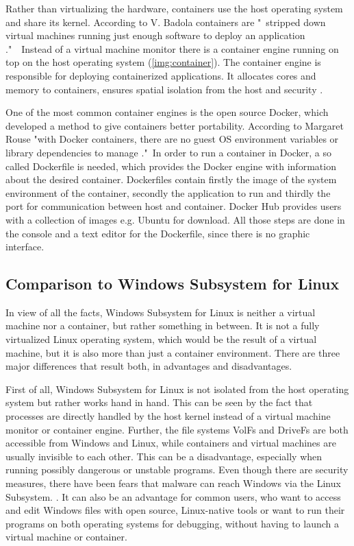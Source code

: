 \documentclass[utf8,biblatex, ngerman, english]{lni}
\begin{document}
Rather than virtualizing the hardware, containers use the host operating system and share its kernel. According to V. Badola containers are "\ stripped down virtual machines running just enough software to deploy an application \cite{Ba15}."\ \ Instead of a virtual machine monitor there is a container engine running on top on the host operating system (\ref{img:container}). 
The container engine is responsible for deploying containerized applications. It allocates cores and memory to containers, ensures spatial isolation from the host and security \cite{Do17}.

One of the most common container engines is the open source Docker, which developed a method to give containers better portability. According to Margaret Rouse "with Docker containers, there are no guest OS environment variables or library dependencies to manage \cite{Ma}."\ In order to run a container in Docker, a so called Dockerfile is needed, which provides the Docker engine with information about the desired container.
Dockerfiles contain firstly the image of the system environment of the container, secondly the application to run and thirdly the port for communication between host and container. Docker Hub provides users with a collection of images e.g. Ubuntu for download. All those steps are done in the console and a text editor for the Dockerfile, since there is no graphic interface.

\subsection{Comparison to Windows Subsystem for Linux}

In view of all the facts, Windows Subsystem for Linux is neither a virtual machine nor a container, but rather something in between. It is not a fully virtualized Linux operating system, which would be the result of a virtual machine, but it is also more than just a container environment. There are three major differences that result both, in advantages and disadvantages.


First of all, Windows Subsystem for Linux is not isolated from the host operating system but rather works hand in hand. This can be seen by the fact that processes are directly handled by the host kernel instead of a virtual machine monitor or container engine. Further, the file systems VolFs and DriveFs are both accessible from Windows and Linux, while containers and virtual machines are usually invisible to each other. This can be a disadvantage, especially when running possibly dangerous or unstable programs. Even though there are security measures, there have been fears that malware can reach Windows via the Linux Subsystem. \cite{Tu17}. It can also be an advantage for common users, who want to access and edit Windows files with open source, Linux-native tools or want to run their programs on both operating systems for debugging, without having to launch a virtual machine or container.
\end{document}
